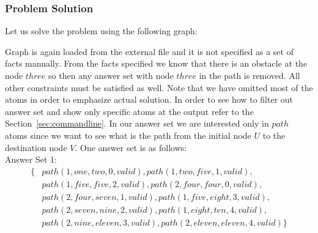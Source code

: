\documentclass[14pt,a4paper, titlepage]{article}
\begin{document}
\subsubsection{Problem Solution} 
Let us solve the problem using the following graph:  
\begin{center}
\end{center}
Graph is again loaded from the external file and it is not 
specified as a set of facts manually. From the facts 
specified we know that there is an obstacle at the node 
$\mathit{three}$ so then any answer set with node 
$\mathit{three}$ in the path is removed. All other 
constraints must be satisfied as well. Note that we have 
omitted most of the atoms in order to emphasize actual 
solution. In order to see how to filter out answer set and 
show only specific atoms at the output refer to the 
Section~\ref{sec:commandline}. In our answer set we are 
interested only in $\mathit{path}$ atoms since we want to 
see what is the path from the initial node $U$ to the 
destination node $V$. One answer set is as follows:
\\Answer Set 1:
\begin{align*}
\{ & path(1,one,two,0,valid), path(1,two,five,1,valid),
\\ & path(1,five,five,2,valid), path(2,four,four,0,valid),
\\ & path(2,four,seven,1,valid), 
path(1,five,eight,3,valid),
\\ & path(2,seven,nine,2,valid), path(1,eight,ten,4,valid),
\\ & 
path(2,nine,eleven,3,valid),path(2,eleven,eleven,4,valid) 
\}
\end{align*} 
\end{document}
